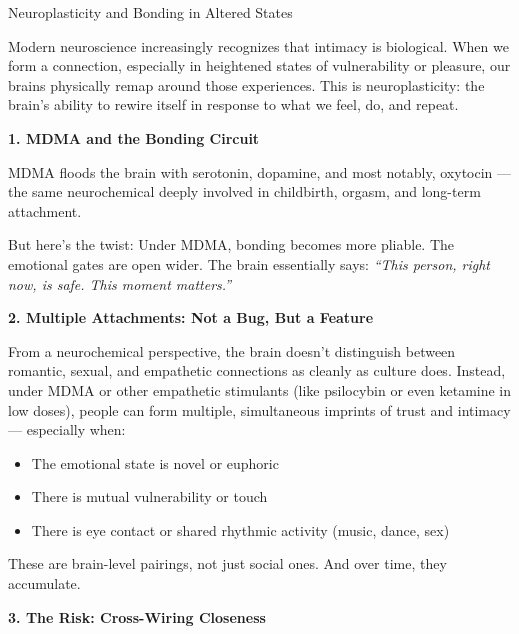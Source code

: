 \begin{TechnicalSidebar}{Neuroplasticity and Bonding in Altered States}

  Modern neuroscience increasingly recognizes that intimacy is  biological.
  When we form a connection, especially in heightened states of vulnerability or pleasure, 
  our brains physically remap around those experiences. This is neuroplasticity: the brain’s 
  ability to rewire itself in response to what we feel, do, and repeat.
  
  \medskip
  
  \textbf{1. MDMA and the Bonding Circuit}
  
  MDMA floods the brain with serotonin, dopamine, and most notably, oxytocin — the same neurochemical 
  deeply involved in childbirth, orgasm, and long-term attachment.

  \medskip
  
  
  But here’s the twist:
  Under MDMA, bonding becomes more pliable. The emotional gates are open wider.
  The brain essentially says:
  \textit{“This person, right now, is safe. This moment matters.”}
  
  \medskip
  
  \textbf{2. Multiple Attachments: Not a Bug, But a Feature}

  \medskip
  
  
  From a neurochemical perspective, the brain doesn’t distinguish between romantic, 
  sexual, and empathetic 
  connections as cleanly as culture does.
  Instead, under MDMA or other empathetic stimulants (like psilocybin or even ketamine 
  in low doses), 
  people can form multiple, simultaneous imprints of trust and intimacy — especially when:

  \medskip
  
  
  \begin{itemize}
    \item The emotional state is novel or euphoric
    \item There is mutual vulnerability or touch
    \item There is eye contact or shared rhythmic activity (music, dance, sex)
  \end{itemize}

  \medskip
  
  
  These are brain-level pairings, not just social ones.
  And over time, they accumulate.
  
  \medskip
  
  \textbf{3. The Risk: Cross-Wiring Closeness}


\end{TechnicalSidebar}
